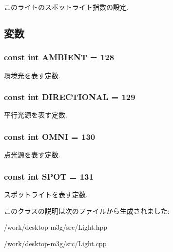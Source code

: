 このライトのスポットライト指数の設定. 

\subsection{変数}
\hypertarget{classm3g_1_1Light_4cf648a82d9de62a1fb15f4277049594}{
\subsubsection[{AMBIENT}]{\setlength{\rightskip}{0pt plus 5cm}const int {\bf AMBIENT} = 128}}
\label{classm3g_1_1Light_4cf648a82d9de62a1fb15f4277049594}


環境光を表す定数. \hypertarget{classm3g_1_1Light_a2fb668ca8bbeb8323eda98fba594fda}{
\subsubsection[{DIRECTIONAL}]{\setlength{\rightskip}{0pt plus 5cm}const int {\bf DIRECTIONAL} = 129}}
\label{classm3g_1_1Light_a2fb668ca8bbeb8323eda98fba594fda}


平行光源を表す定数. \hypertarget{classm3g_1_1Light_34d360bb8395ad7fbcd3ec286ece64cb}{
\subsubsection[{OMNI}]{\setlength{\rightskip}{0pt plus 5cm}const int {\bf OMNI} = 130}}
\label{classm3g_1_1Light_34d360bb8395ad7fbcd3ec286ece64cb}


点光源を表す定数. \hypertarget{classm3g_1_1Light_c44aef16b96dc8fd8b134416964a7de9}{
\subsubsection[{SPOT}]{\setlength{\rightskip}{0pt plus 5cm}const int {\bf SPOT} = 131}}
\label{classm3g_1_1Light_c44aef16b96dc8fd8b134416964a7de9}


スポットライトを表す定数. 

このクラスの説明は次のファイルから生成されました:\begin{CompactItemize}
\item 
/work/desktop-m3g/src/Light.hpp\item 
/work/desktop-m3g/src/Light.cpp\end{CompactItemize}
